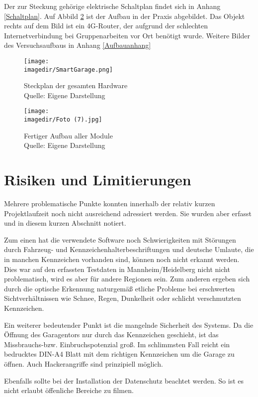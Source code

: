 Der zur Steckung gehörige elektrische Schaltplan findet sich in Anhang \ref{Schaltplan}.
Auf Abbild \ref{Aufbau1} ist der Aufbau in der Praxis abgebildet. Das Objekt rechts auf dem Bild ist ein 4G-Router, der aufgrund der schlechten Internetverbindung bei Gruppenarbeiten vor Ort benötigt wurde.
Weitere Bilder des Versuchsaufbaus in Anhang \ref{Aufbauanhang}
\begin{figure}[H]
	\centering 
	\texttt{[image: \\imagedir/SmartGarage.png]}
	\captionsetup{format=hang}
	\caption[Steckplan]{\label{Steckplansm}Steckplan der gesamten Hardware \\Quelle: Eigene Darstellung}
\end{figure}
\begin{figure}
	\centering 
	\label{}
	\texttt{[image: \\imagedir/Foto (7).jpg]}
	\captionsetup{format=hang}
	\caption[Versuchsaufbau]{\label{Aufbau1}Fertiger Aufbau aller Module\\Quelle: Eigene Darstellung}
\end{figure}
\chapter{Risiken und Limitierungen}

Mehrere problematische Punkte konnten innerhalb der relativ kurzen Projektlaufzeit noch nicht ausreichend adressiert werden. Sie wurden aber erfasst und in diesem kurzen Abschnitt notiert.

Zum einen hat die verwendete Software noch Schwierigkeiten mit Störungen durch Fahrzeug- und Kennzeichenhalterbeschriftungen und deutsche Umlaute, die in manchen Kennzeichen vorhanden sind, können noch nicht erkannt werden. Dies war auf den erfassten Testdaten in Mannheim/Heidelberg nicht nicht problematisch, wird es aber für andere Regionen sein.
Zum anderen ergeben sich durch die optische Erkennung naturgemäß etliche Probleme bei erschwerten Sichtverhältnissen wie Schnee, Regen, Dunkelheit oder schlicht verschmutzten Kennzeichen. 

Ein weiterer bedeutender Punkt ist die mangelnde Sicherheit des Systems. Da die Öffnung des Garagentors nur durch das Kennzeichen geschieht, ist das Missbrauchs-bzw. Einbruchspotenzial groß. Im schlimmsten Fall reicht ein bedrucktes DIN-A4 Blatt mit dem richtigen Kennzeichen um die Garage zu öffnen. Auch Hackerangriffe sind prinzipiell möglich.

Ebenfalls sollte bei der Installation der Datenschutz beachtet werden. So ist es nicht erlaubt öffenliche Bereiche zu filmen.

